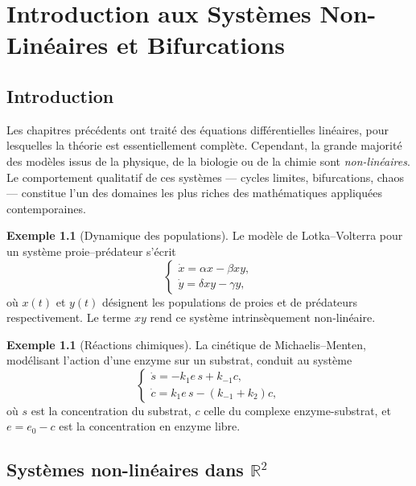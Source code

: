 \documentclass[12pt,a4paper,openany]{book}
\theoremstyle{definition}
\newtheorem{exemple}[definition]{Exemple}
\theoremstyle{plain}
\theoremstyle{remark}
\newcommand{\R}{\mathbb{R}}
\begin{document}
\chapter{Introduction aux Systèmes Non-Linéaires et Bifurcations}
\label{chap:nonlineaire}

\section*{Introduction}

Les chapitres précédents ont traité des équations différentielles
linéaires, pour lesquelles la théorie est essentiellement complète.
Cependant, la grande majorité des modèles issus de la physique, de
la biologie ou de la chimie sont \emph{non-linéaires}. Le comportement
qualitatif de ces systèmes --- cycles limites, bifurcations, chaos ---
constitue l'un des domaines les plus riches des mathématiques appliquées
contemporaines.

\begin{exemple}[Dynamique des populations]
\label{ex:motivation-nonlin}
Le modèle de Lotka--Volterra pour un système proie--prédateur s'écrit
\[
\begin{cases}
\dot{x} = \alpha x - \beta xy, \\
\dot{y} = \delta xy - \gamma y,
\end{cases}
\]
où $x(t)$ et $y(t)$ désignent les populations de proies et de
prédateurs respectivement. Le terme $xy$ rend ce système intrinsèquement
non-linéaire.
\end{exemple}

\begin{exemple}[Réactions chimiques]
\label{ex:motivation-chimie}
La cinétique de Michaelis--Menten, modélisant l'action d'une enzyme
sur un substrat, conduit au système
\[
\begin{cases}
\dot{s} = -k_1 e\, s + k_{-1} c, \\
\dot{c} = k_1 e\, s - (k_{-1} + k_2) c,
\end{cases}
\]
où $s$ est la concentration du substrat, $c$ celle du complexe
enzyme-substrat, et $e = e_0 - c$ est la concentration en enzyme libre.
\end{exemple}

\section{Systèmes non-linéaires dans \texorpdfstring{$\R^2$}{R²}}
\label{sec:syst-nonlin-R2}
\end{document}
